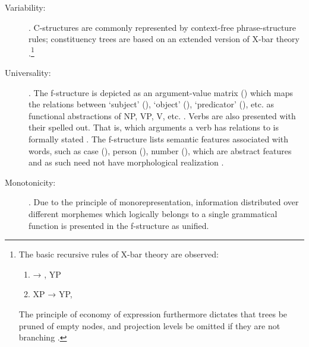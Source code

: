 \begin{description}
\item[Variability:] . 
C-structures are commonly represented by context-free phrase-structure rules; 
constituency trees are based on an extended version of X-bar theory 
\citep[42]{bresnan2016}.\footnote{The basic recursive rules of X-bar theory 
are observed:
\begin{enumerate}[nosep, leftmargin={2\footnotemargin}]
\item {} → , YP
\item XP → YP, 
\end{enumerate}

The principle of economy of expression furthermore dictates that trees be 
pruned of empty nodes, and projection levels be omitted if they are not 
branching \citep[119--128]{bresnan2016}.}

\item[Universality:] . The f-structure is depicted 
as an argument-value matrix (\Avm{}) which maps the relations between 
`subject' (\Sbj{}), `object' (\Obj{}), `predicator' (\Pred{}), etc. as 
functional abstractions of NP, VP, V, etc. \citep[42]{bresnan2016}. Verbs 
are also presented with their  spelled out. That is, which 
arguments a verb has relations to is formally stated \citep[15]{bresnan2016}. 
The f-structure lists semantic features associated with words, such as case 
(\Case{}), person (\Pers{}), number (\Num{}), which are abstract features and as 
such need not have morphological realization \citep[43]{bresnan2016}.

\item[Monotonicity:] . Due to the principle of monorepresentation, 
information distributed over different morphemes which logically 
belongs to a single grammatical function is presented in the f-structure as 
unified.

\end{description}

